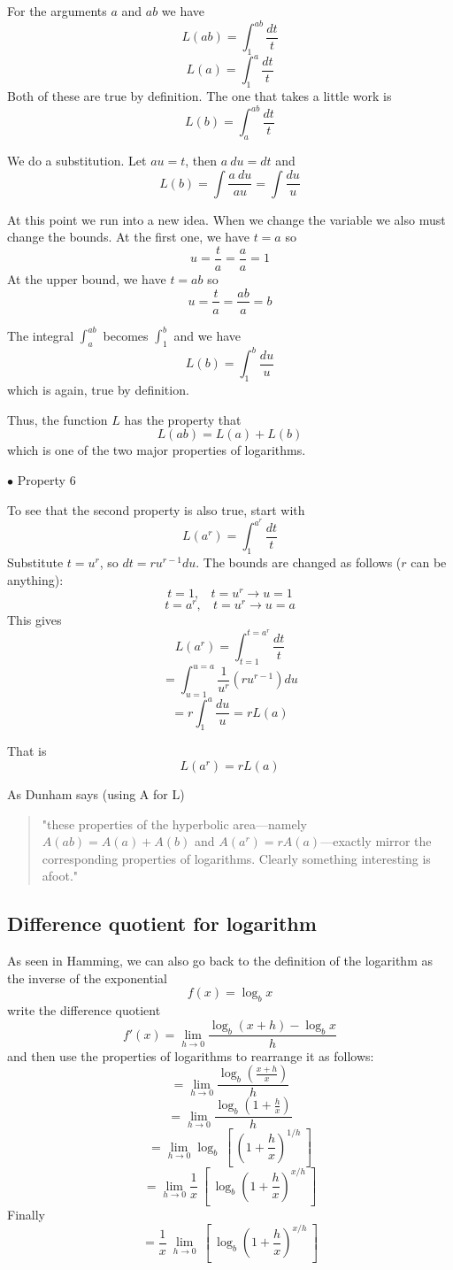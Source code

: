 \documentclass[11pt, oneside]{article}
\begin{document}
For the arguments $a$ and $ab$ we have 
\[ L(ab) = \int_1^{ab} \frac{dt}{t}   \]
\[ L(a) = \int_1^{a} \frac{dt}{t}   \]
Both of these are true by definition.  The one that takes a little work is
\[ L(b) = \int_a^{ab} \frac{dt}{t}   \]

We do a substitution.  Let $au=t$, then $a \ du = dt$ and
\[ L(b) = \int \frac{a \ du}{au} = \int \frac{du}{u}  \]

At this point we run into a new idea.  When we change the variable we also must change the bounds.  At the first one, we have $t = a$ so
\[ u = \frac{t}{a} = \frac{a}{a} = 1  \]
At the upper bound, we have $t = ab$ so
\[ u = \frac{t}{a} = \frac{ab}{a} = b  \]

The integral $\int_a^{ab}$ becomes $\int_1^{b}$ and we have
\[ L(b) = \int_1^b \frac{du}{u}  \]
which is again, true by definition.  

Thus, the function $L$ has the property that
\[ L(ab) = L(a) + L(b) \]
which is one of the two major properties of logarithms.

$\bullet  $ Property 6

To see that the second property is also true, start with
\[ L(a^r) = \int_1^{a^r} \frac{dt}{t}   \]
Substitute $t=u^r$, so $dt = ru^{r-1} du$.  The bounds are changed as follows ($r$ can be anything):
\[ t = 1, \ \ \ \  t = u^r \rightarrow  u= 1  \]
\[ t = a^r, \ \ \ \   t = u^r \rightarrow  u = a  \]
This gives
\[ L(a^r) = \int_{t=1}^{t=a^r} \frac{dt}{t} \]
\[ = \int_{u=1}^{u=a} \frac{1}{u^r} (ru^{r-1}) du \]
\[ = r \int_{1}^{a}  \frac{du}{u} = rL(a) \]

That is
\[ L(a^r) = rL(a) \]

As Dunham says (using A for L) 
\begin{quote}"these properties of the hyperbolic area---namely $A(ab) = A(a) + A(b)$ and $A(a^r) = rA(a)$---exactly mirror the corresponding properties of logarithms.  Clearly something interesting is afoot."\end{quote}

\subsection*{Difference quotient for logarithm}
As seen in Hamming, we can also go back to the definition of the logarithm as the inverse of the exponential
\[ f(x) = \log_b x \]
write the difference quotient
\[ f'(x) = \lim_{h \rightarrow 0}  \frac{\log_b (x + h) - \log_b x}{h}  \]
and then use the properties of logarithms to rearrange it as follows:
\[ =  \lim_{h \rightarrow 0} \frac{\log_b (\frac{x+h}{x})}{h} \]
\[ =  \lim_{h \rightarrow 0} \frac{\log_b (1 + \frac{h}{x})}{h} \]
\[ =  \lim_{h \rightarrow 0} \log_b \ [ \ (1 + \frac{h}{x})^{1/h} \ ]  \]
\[ =  \lim_{h \rightarrow 0} \frac{1}{x}  \ [ \ \log_b (1 + \frac{h}{x})^{x/h}  \ ]  \]
Finally
\[ =   \frac{1}{x}  \ \lim_{h \rightarrow 0}  \ [ \ \log_b (1 + \frac{h}{x})^{x/h}  \ ]  \]
\end{document}
